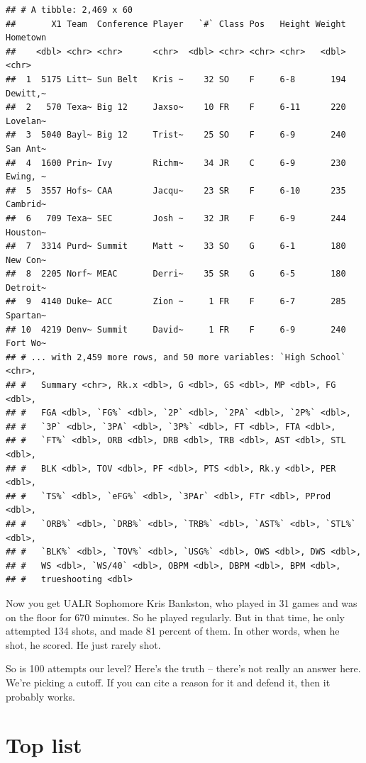 \documentclass[]{book}
\begin{document}
\begin{verbatim}
## # A tibble: 2,469 x 60
##       X1 Team  Conference Player   `#` Class Pos   Height Weight Hometown
##    <dbl> <chr> <chr>      <chr>  <dbl> <chr> <chr> <chr>   <dbl> <chr>   
##  1  5175 Litt~ Sun Belt   Kris ~    32 SO    F     6-8       194 Dewitt,~
##  2   570 Texa~ Big 12     Jaxso~    10 FR    F     6-11      220 Lovelan~
##  3  5040 Bayl~ Big 12     Trist~    25 SO    F     6-9       240 San Ant~
##  4  1600 Prin~ Ivy        Richm~    34 JR    C     6-9       230 Ewing, ~
##  5  3557 Hofs~ CAA        Jacqu~    23 SR    F     6-10      235 Cambrid~
##  6   709 Texa~ SEC        Josh ~    32 JR    F     6-9       244 Houston~
##  7  3314 Purd~ Summit     Matt ~    33 SO    G     6-1       180 New Con~
##  8  2205 Norf~ MEAC       Derri~    35 SR    G     6-5       180 Detroit~
##  9  4140 Duke~ ACC        Zion ~     1 FR    F     6-7       285 Spartan~
## 10  4219 Denv~ Summit     David~     1 FR    F     6-9       240 Fort Wo~
## # ... with 2,459 more rows, and 50 more variables: `High School` <chr>,
## #   Summary <chr>, Rk.x <dbl>, G <dbl>, GS <dbl>, MP <dbl>, FG <dbl>,
## #   FGA <dbl>, `FG%` <dbl>, `2P` <dbl>, `2PA` <dbl>, `2P%` <dbl>,
## #   `3P` <dbl>, `3PA` <dbl>, `3P%` <dbl>, FT <dbl>, FTA <dbl>,
## #   `FT%` <dbl>, ORB <dbl>, DRB <dbl>, TRB <dbl>, AST <dbl>, STL <dbl>,
## #   BLK <dbl>, TOV <dbl>, PF <dbl>, PTS <dbl>, Rk.y <dbl>, PER <dbl>,
## #   `TS%` <dbl>, `eFG%` <dbl>, `3PAr` <dbl>, FTr <dbl>, PProd <dbl>,
## #   `ORB%` <dbl>, `DRB%` <dbl>, `TRB%` <dbl>, `AST%` <dbl>, `STL%` <dbl>,
## #   `BLK%` <dbl>, `TOV%` <dbl>, `USG%` <dbl>, OWS <dbl>, DWS <dbl>,
## #   WS <dbl>, `WS/40` <dbl>, OBPM <dbl>, DBPM <dbl>, BPM <dbl>,
## #   trueshooting <dbl>
\end{verbatim}

Now you get UALR Sophomore Kris Bankston, who played in 31 games and was
on the floor for 670 minutes. So he played regularly. But in that time,
he only attempted 134 shots, and made 81 percent of them. In other
words, when he shot, he scored. He just rarely shot.

So is 100 attempts our level? Here's the truth -- there's not really an
answer here. We're picking a cutoff. If you can cite a reason for it and
defend it, then it probably works.

\section{Top list}\label{top-list}
\end{document}
